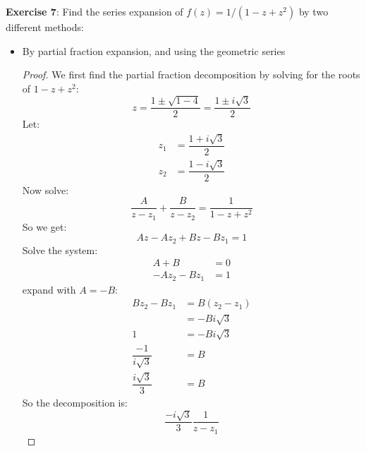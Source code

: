 \documentclass{article}
\begin{document}
\textbf{Exercise 7}: Find the series expansion of $f(z) = 1/(1 - z + z^{2})$ by two different methods:
    \begin{itemize}
        \item By partial fraction expansion, and using the geometric series
            \begin{proof}
                We first find the partial fraction decomposition by solving for the roots of $1 - z + z^{2}$:
                    \begin{equation*}
                        z = \dfrac{1 \pm \sqrt{1 - 4}}{2} = \dfrac{1 \pm i\sqrt{3}}{2}
                    \end{equation*}
                Let:
                    \begin{align*}
                        z_{1} &= \dfrac{1 + i\sqrt{3}}{2} \\
                        z_{2} &= \dfrac{1 - i\sqrt{3}}{2}   
                    \end{align*}
                Now solve:
                    \begin{equation*}
                        \dfrac{A}{z - z_{1}} + \dfrac{B}{z - z_{2}} = \dfrac{1}{1 - z + z^{2}}
                    \end{equation*}
                So we get:
                    \begin{equation*}
                        Az - Az_{2} + Bz - Bz_{1} = 1
                    \end{equation*}
                Solve the system:
                    \begin{align*}
                        A + B               &= 0 \\
                        -Az_{2} - Bz_{1} &= 1   
                    \end{align*}
                expand with $A = -B$:
                    \begin{align*}
                        Bz_{2} - Bz_{1}       &= B(z_{2} - z_{1}) \\
                                              &= -Bi\sqrt{3}      \\
                        1                     &= -Bi\sqrt{3}      \\
                        \dfrac{-1}{i\sqrt{3}} &= B                \\
                        \dfrac{i\sqrt{3}}{3}  &= B                  
                    \end{align*}
                So the decomposition is:
                    \begin{equation*}
                        \dfrac{-i\sqrt{3}}{3}\dfrac{1}{z - z_{1}}
                    \end{equation*}
            \end{proof}


\end{itemize}
\end{document}

